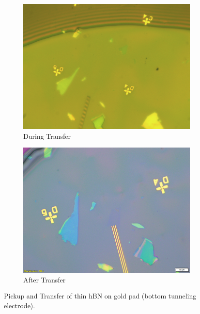 \begin{figure}[H]
\begin{subfigure}[b]{0.4\textwidth}
		\includegraphics[width=\textwidth]{figures/during_transfer.jpg}
		\caption{During Transfer}
	\end{subfigure}
	\qquad
	\begin{subfigure}[b]{0.4\textwidth}
		\centering
		\includegraphics[width=\textwidth]{figures/after_transfer.jpg}
		\caption{After Transfer}
	\end{subfigure}
	\caption{Pickup and Transfer of thin hBN on gold pad (bottom tunneling electrode).}
	\label{fig:hbnongoldpad}
\end{figure}

